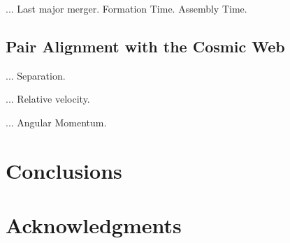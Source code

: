 \documentclass[a4,useAMS,usenatbib,usegraphicx]{latex/mn2e}
\begin{document}
... Last major merger. Formation Time. Assembly Time.

\subsection{Pair Alignment with the Cosmic Web}
\label{subsec:alignment_cosmic_web}

... Separation.

... Relative velocity.

... Angular Momentum.


\section{Conclusions}
\label{sec:conclusions}


\section*{Acknowledgments}  



 




\end{document}
